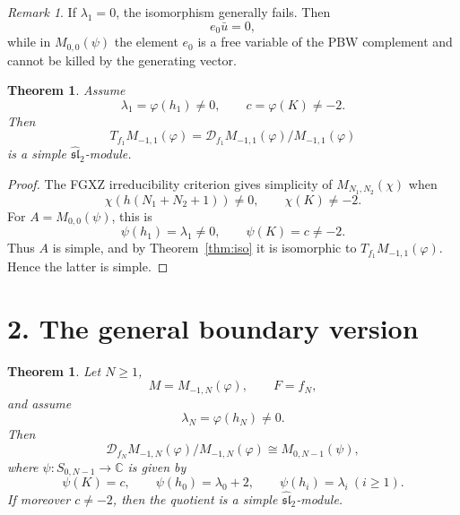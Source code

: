 \documentclass[11pt]{article}
\newcommand{\C}{\mathbb C}
\newcommand{\slh}{\widehat{\mathfrak{sl}}_2}
\newcommand{\D}{\mathcal D}
\theoremstyle{plain}
\newtheorem{theorem}[lemma]{Theorem}
\theoremstyle{remark}
\newtheorem{remark}[lemma]{Remark}
\begin{document}
\begin{remark}
If \(\lambda_1=0\), the isomorphism generally fails. Then
\[
  e_0\bar u=0,
\]
while in \(M_{0,0}(\psi)\) the element \(e_0\) is a free variable of the PBW
complement and cannot be killed by the generating vector.
\end{remark}

\begin{theorem}\label{thm:simple}
Assume
\[
  \lambda_1=\varphi(h_1)\ne0,\qquad c=\varphi(K)\ne-2.
\]
Then
\[
  T_{f_1}M_{-1,1}(\varphi)=\D_{f_1}M_{-1,1}(\varphi)/M_{-1,1}(\varphi)
\]
is a simple \(\slh\)-module.
\end{theorem}

\begin{proof}
The FGXZ irreducibility criterion gives simplicity of \(M_{N_1,N_2}(\chi)\)
when
\[
  \chi(h(N_1+N_2+1))\ne0,\qquad \chi(K)\ne-2.
\]
For \(A=M_{0,0}(\psi)\), this is
\[
  \psi(h_1)=\lambda_1\ne0,\qquad \psi(K)=c\ne-2.
\]
Thus \(A\) is simple, and by Theorem~\ref{thm:iso} it is isomorphic to
\(T_{f_1}M_{-1,1}(\varphi)\). Hence the latter is simple.
\end{proof}

\section*{2. The general boundary version}

\begin{theorem}\label{thm:general}
Let \(N\ge1\),
\[
  M=M_{-1,N}(\varphi),\qquad F=f_N,
\]
and assume
\[
  \lambda_N=\varphi(h_N)\ne0.
\]
Then
\[
  \D_{f_N}M_{-1,N}(\varphi)/M_{-1,N}(\varphi)
  \cong
  M_{0,N-1}(\psi),
\]
where \(\psi:S_{0,N-1}\to\C\) is given by
\[
  \psi(K)=c,\qquad
  \psi(h_0)=\lambda_0+2,\qquad
  \psi(h_i)=\lambda_i\ (i\ge1).
\]
If moreover \(c\ne-2\), then the quotient is a simple \(\slh\)-module.
\end{theorem}
\end{document}
